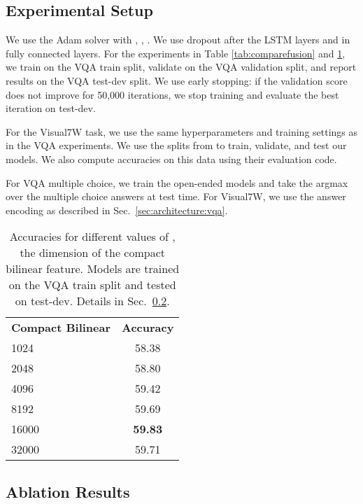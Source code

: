\documentclass[11pt,letterpaper]{article}
\DeclareRobustCommand{\secref}[1]{Sec.~\ref{#1}}
\DeclareRobustCommand{\Secref}[1]{Sec.~\ref{#1}}
\newcommand{\twocmidrule}{\cmidrule(lr){1-1}\cmidrule(lr){2-2}}
\begin{document}
\subsection{Experimental Setup}

We use the Adam solver with , , . We use dropout after the LSTM layers and in fully connected layers. For the experiments in Table \ref{tab:comparefusion} and  \ref{tab:comparedvalue}, we train on the VQA train split, validate on the VQA validation split, and report results on the VQA test-dev split. We use early stopping: if the validation score does not improve for 50,000 iterations, we stop training and evaluate the best iteration on test-dev.

For the Visual7W task, we use the same hyperparameters and training settings as in the VQA experiments. We use the splits from \cite{zhu16cvpr} to train, validate, and test our models. We also compute accuracies on this data using their evaluation code.

For VQA multiple choice, we train the open-ended models and take the argmax over the multiple choice answers at test time. For Visual7W, we use the answer encoding as described in \secref{sec:architecture:vqa}.

\begin{table}
\centering
\small
\begin{tabular}{lc}
\toprule
\bf Compact Bilinear  & \bf Accuracy \\ 
\twocmidrule
1024 & 58.38 \\
2048 & 58.80 \\
4096 & 59.42 \\
8192 & 59.69 \\
16000 & \textbf{59.83} \\
32000 & 59.71 \\
\bottomrule
\end{tabular}
\caption{Accuracies for different values of , the dimension of the compact bilinear feature. Models are trained on the VQA train split and tested on test-dev. Details in \Secref{sec:ablation}.}
\label{tab:comparedvalue}
\end{table}




\subsection{Ablation Results}
\label{sec:ablation}
\end{document}
